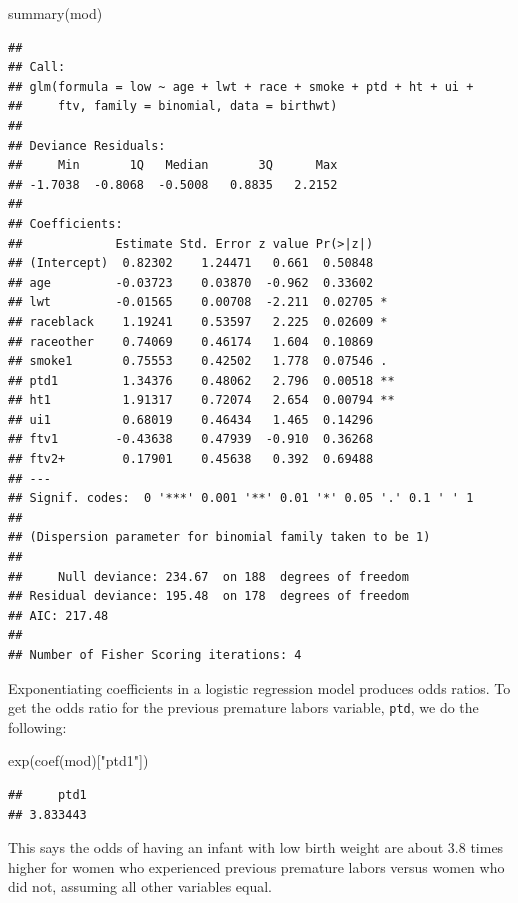 \documentclass[
]{book}
\newenvironment{Shaded}{\begin{snugshade}}{\end{snugshade}}
\newcommand{\FunctionTok}[1]{\textcolor[rgb]{0.00,0.00,0.00}{#1}}
\newcommand{\NormalTok}[1]{#1}
\newcommand{\StringTok}[1]{\textcolor[rgb]{0.31,0.60,0.02}{#1}}
\begin{document}
\begin{Shaded}
\begin{Highlighting}[]
\FunctionTok{summary}\NormalTok{(mod)}
\end{Highlighting}
\end{Shaded}

\begin{verbatim}
## 
## Call:
## glm(formula = low ~ age + lwt + race + smoke + ptd + ht + ui + 
##     ftv, family = binomial, data = birthwt)
## 
## Deviance Residuals: 
##     Min       1Q   Median       3Q      Max  
## -1.7038  -0.8068  -0.5008   0.8835   2.2152  
## 
## Coefficients:
##             Estimate Std. Error z value Pr(>|z|)   
## (Intercept)  0.82302    1.24471   0.661  0.50848   
## age         -0.03723    0.03870  -0.962  0.33602   
## lwt         -0.01565    0.00708  -2.211  0.02705 * 
## raceblack    1.19241    0.53597   2.225  0.02609 * 
## raceother    0.74069    0.46174   1.604  0.10869   
## smoke1       0.75553    0.42502   1.778  0.07546 . 
## ptd1         1.34376    0.48062   2.796  0.00518 **
## ht1          1.91317    0.72074   2.654  0.00794 **
## ui1          0.68019    0.46434   1.465  0.14296   
## ftv1        -0.43638    0.47939  -0.910  0.36268   
## ftv2+        0.17901    0.45638   0.392  0.69488   
## ---
## Signif. codes:  0 '***' 0.001 '**' 0.01 '*' 0.05 '.' 0.1 ' ' 1
## 
## (Dispersion parameter for binomial family taken to be 1)
## 
##     Null deviance: 234.67  on 188  degrees of freedom
## Residual deviance: 195.48  on 178  degrees of freedom
## AIC: 217.48
## 
## Number of Fisher Scoring iterations: 4
\end{verbatim}

Exponentiating coefficients in a logistic regression model produces odds ratios. To get the odds ratio for the previous premature labors variable, \texttt{ptd}, we do the following:

\begin{Shaded}
\begin{Highlighting}[]
\FunctionTok{exp}\NormalTok{(}\FunctionTok{coef}\NormalTok{(mod)[}\StringTok{"ptd1"}\NormalTok{])}
\end{Highlighting}
\end{Shaded}

\begin{verbatim}
##     ptd1 
## 3.833443
\end{verbatim}

This says the odds of having an infant with low birth weight are about 3.8 times higher for women who experienced previous premature labors versus women who did not, assuming all other variables equal.
\end{document}
